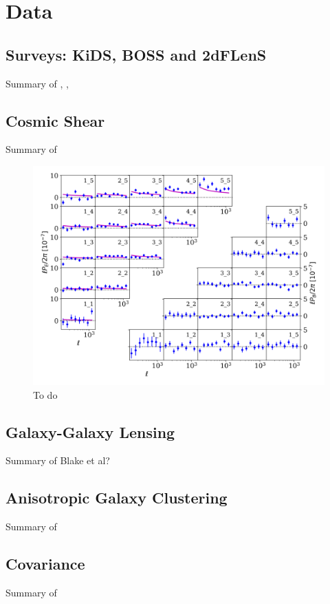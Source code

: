 \section{Data}
\label{sec:data}

\subsection{Surveys:  KiDS, BOSS and 2dFLenS}
\label{sec:surveys}
Summary of \citet{kuijken/etal:2019},  \citet{blake/etal:2016}, \citet{alam/etal:2015}

\subsection{Cosmic Shear}
\label{sec:cosmic_shear}
Summary of \citet{asgari/etal:inprep}

\begin{figure}
        \includegraphics[width=\columnwidth]{Data_Plots/Pkk/Pkk_K1000_2Dbins_v2_goldclasses_Flag_SOM_Fid.png}
        \caption{To do }
        \label{fig:Pkk}
\end{figure}

\subsection{Galaxy-Galaxy Lensing}
\label{sec:GGL}
Summary of Blake et al?

\subsection{Anisotropic Galaxy Clustering}
\label{sec:clustering}
Summary of \citet{sanchez/etal:2017}

\subsection{Covariance}
\label{sec:Cov}
Summary of \citet{joachimi/etal:inprep}

